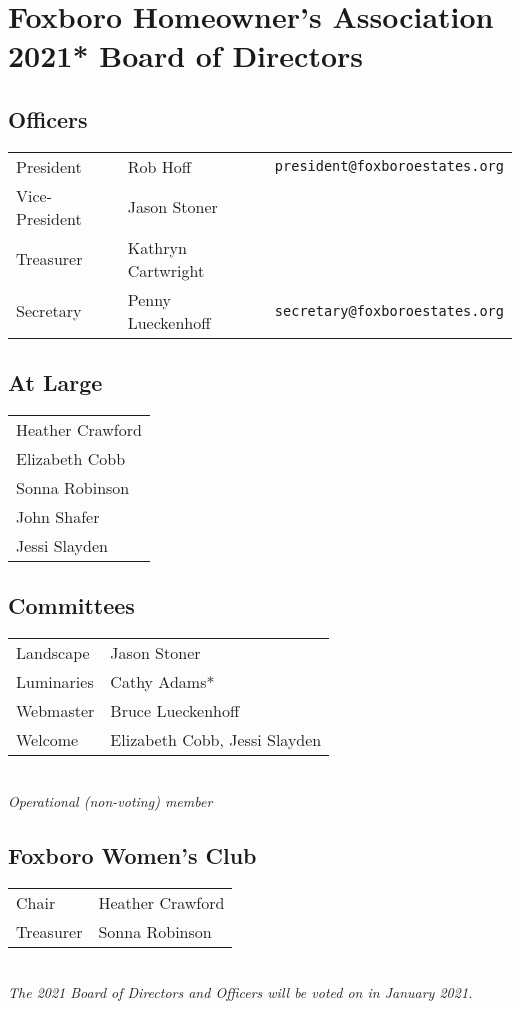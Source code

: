 \section{Foxboro Homeowner’s Association 2021* Board of Directors}

\subsection{Officers}
\begin{tabular}{lll}
	President & Rob Hoff & \verb'president@foxboroestates.org' \\
	Vice-President & Jason Stoner & \\
	Treasurer & Kathryn Cartwright & \\
	Secretary & Penny Lueckenhoff & \verb'secretary@foxboroestates.org' \\
\end{tabular}


\subsection{At Large}
\begin{tabular}{l}
	Heather Crawford \\
	Elizabeth Cobb \\
	Sonna Robinson \\
	John Shafer \\
	Jessi Slayden \\
\end{tabular}

\subsection{Committees}
\begin{tabular}{ll}
	Landscape & Jason Stoner \\
	Luminaries & Cathy Adams* \\
	Webmaster & Bruce Lueckenhoff \\
	Welcome	& Elizabeth Cobb, Jessi Slayden \\
\end{tabular}
\\

{\it *Operational (non-voting) member }

\subsection{Foxboro Women’s Club}
\begin{tabular}{ll}
	Chair & Heather Crawford \\
	Treasurer & Sonna Robinson \\
\end{tabular}
\\

{\it *The 2021 Board of Directors and Officers will be voted on in
January 2021. }

